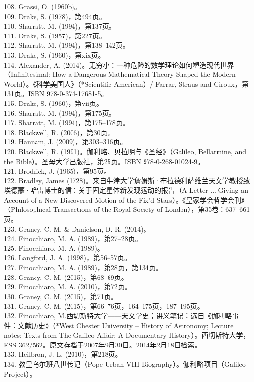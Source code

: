 108. Grassi, O. (1960b)。\\
109. Drake, S. (1978)，第494页。\\
110. Sharratt, M. (1994)，第137页。\\
111. Drake, S. (1957)，第227页。\\
112. Sharratt, M. (1994)，第138–142页。\\
113. Drake, S. (1960)，第xix页。\\
114. Alexander, A. (2014)。无穷小：一种危险的数学理论如何塑造现代世界（Infinitesimal: How a Dangerous Mathematical Theory Shaped the Modern World）。《科学美国人》（*Scientific American）/ Farrar, Straus and Giroux，第131页。ISBN 978-0-374-17681-5。\\
115. Drake, S. (1960)，第vii页。\\
116. Sharratt, M. (1994)，第175页。\\
117. Sharratt, M. (1994)，第175–178页。\\
118. Blackwell, R. (2006)，第30页。\\
119. Hannam, J. (2009)，第303–316页。\\
120. Blackwell, R. (1991)。伽利略、贝拉明与《圣经》（Galileo, Bellarmine, and the Bible）。圣母大学出版社，第25页。ISBN 978-0-268-01024-9。\\
121. Brodrick, J. (1965)，第95页。\\
122. Bradley, James (1728)。来自牛津大学詹姆斯·布拉德利萨维兰天文学教授致埃德蒙·哈雷博士的信：关于固定星体新发现运动的报告（A Letter ... Giving an Account of a New Discovered Motion of the Fix'd Stars）。《皇家学会哲学会刊》（Philosophical Transactions of the Royal Society of London），第35卷：637–661页。\\
123. Graney, C. M. & Danielson, D. R. (2014)。\\
124. Finocchiaro, M. A. (1989)，第27–28页。\\
125. Finocchiaro, M. A. (1989)。\\
126. Langford, J. A. (1998)，第56–57页。\\
127. Finocchiaro, M. A. (1989)，第28页，第134页。\\
128. Graney, C. M. (2015)，第68–69页。\\
129. Finocchiaro, M. A. (2010)，第72页。\\
130. Graney, C. M. (2015)，第71页。\\
131. Graney, C. M. (2015)，第66–76页，164–175页，187–195页。\\
132. Finocchiaro, M.西切斯特大学——天文学史；讲义笔记：选自《伽利略事件：文献历史》（*West Chester University – History of Astronomy; Lecture notes: Texts from The Galileo Affair: A Documentary History）。西切斯特大学，ESS 362/562。原文存档于2007年9月30日。2014年2月18日检索。\\
133. Heilbron, J. L. (2010)，第218页。\\
134. 教皇乌尔班八世传记（Pope Urban VIII Biography）。伽利略项目（Galileo Project）。\\